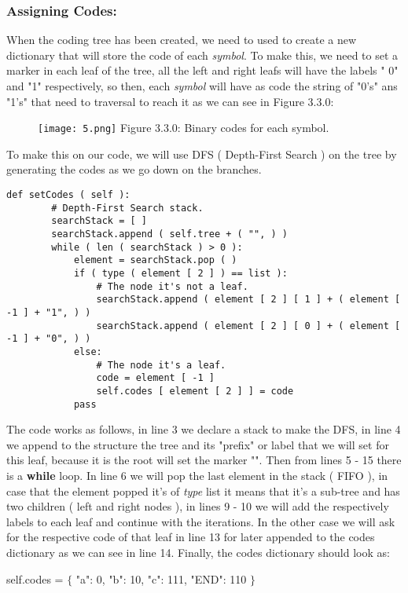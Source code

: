 \subsubsection{Assigning Codes:}

When the coding tree has been created, we need to used to create a new dictionary that will store the code of each {\itshape symbol}. To make this, we need to set a marker in each leaf of the tree, all the left and right leafs will have the labels " 0" and "1" respectively, so then, each {\itshape symbol} will have as code the string of "0's" ans "1's" that need to traversal to reach it as we can see in Figure 3.3.0: \hfill \break

\begin{figure}[H]
\texttt{[image: 5.png]}
\centering \linebreak \linebreak Figure 3.3.0: Binary codes for each symbol.
\end{figure} \hfill \break

To make this on our code, we will use DFS ( Depth-First Search ) on the tree by generating the codes as we go down on the branches. \hfill \break

\begin{lstlisting}
def setCodes ( self ):
        # Depth-First Search stack.
        searchStack = [ ]
        searchStack.append ( self.tree + ( "", ) )
        while ( len ( searchStack ) > 0 ):
            element = searchStack.pop ( )
            if ( type ( element [ 2 ] ) == list ):
                # The node it's not a leaf.
                searchStack.append ( element [ 2 ] [ 1 ] + ( element [ -1 ] + "1", ) )
                searchStack.append ( element [ 2 ] [ 0 ] + ( element [ -1 ] + "0", ) )
            else:
                # The node it's a leaf.
                code = element [ -1 ]
                self.codes [ element [ 2 ] ] = code
            pass
\end{lstlisting} \hfill \break

The code works as follows, in line 3 we declare a stack to make the DFS, in line 4 we append to the structure the tree and its "prefix" or label that we will set for this leaf, because it is the root will set the marker "". Then from lines 5 - 15 there is a {\bfseries while} loop. In line 6 we will pop the last element in the stack ( FIFO ), in case that the element popped it's of {\itshape type} list it means that it's a sub-tree and has two children ( left and right nodes ), in lines 9 - 10 we will add the respectively labels to each leaf and continue with the iterations. In the other case we will ask for the respective code of that leaf in line 13 for later appended to the codes dictionary as we can see in line 14. Finally, the codes dictionary should look as:

\begin{center}
self.codes = $\lbrace$ "a": 0, "b": 10, "c": 111, "END": 110 $\rbrace$
\end{center}

\pagebreak
